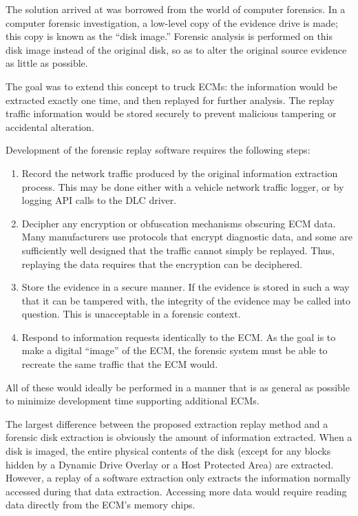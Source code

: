 The solution arrived at was borrowed from the world of computer forensics. In a computer forensic investigation,
a low-level copy of the evidence drive is made; this copy is known as the ``disk image.'' Forensic analysis
is performed on this disk image instead of the original disk, so as to alter the original source evidence as
little as possible.

The goal was to extend this concept to truck ECMs: the information would be extracted exactly one time, and then
replayed for further analysis. The replay traffic information would be stored securely to prevent malicious tampering
or accidental alteration.


Development of the forensic replay software requires the following steps:

\begin{enumerate}
  \item Record the network traffic produced by the original information extraction process. This may be done either with a vehicle
        network traffic logger, or by logging API calls to the DLC driver.
  \item Decipher any encryption or obfuscation mechanisms obscuring ECM data. Many manufacturers use protocols that encrypt diagnostic
        data, and some are sufficiently well designed that the traffic cannot simply be replayed. Thus, replaying the data requires
        that the encryption can be deciphered.
  \item Store the evidence in a secure manner. If the evidence is stored in such a way that it can be tampered with, the integrity of
        the evidence may be called into question. This is unacceptable in a forensic context.
  \item Respond to information requests identically to the ECM. As the goal is to make a digital ``image'' of the ECM, the forensic system
        must be able to recreate the same traffic that the ECM would.
\end{enumerate}

All of these would ideally be performed in a manner that is as general as possible to minimize development time
supporting additional ECMs.


The largest difference between the proposed extraction replay method and a forensic disk extraction is obviously
the amount of information extracted. When a disk is imaged, the entire physical contents of the disk (except for
any blocks hidden by a Dynamic Drive Overlay or a Host Protected Area) are extracted. However, a replay of a
software extraction only extracts the information normally accessed during that data  extraction. Accessing more data
would require reading data directly from the ECM's memory chips.

